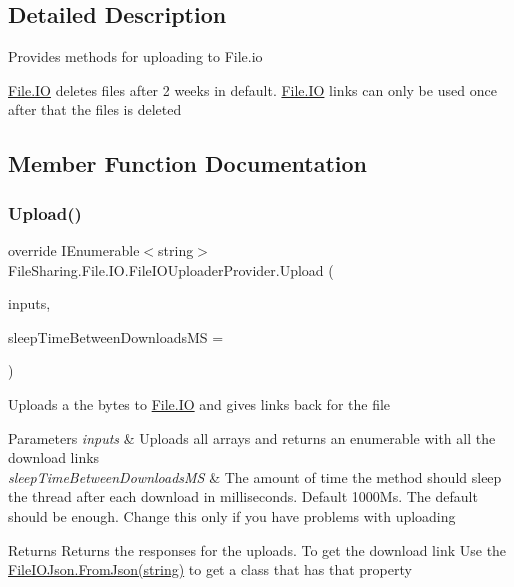 \subsection{Detailed Description}
Provides methods for uploading to File.\+io 

\hyperlink{namespace_file_sharing_1_1_file_1_1_i_o}{File.\+IO} deletes files after 2 weeks in default. \hyperlink{namespace_file_sharing_1_1_file_1_1_i_o}{File.\+IO} links can only be used once after that the files is deleted 

\subsection{Member Function Documentation}
\mbox{\label{class_file_sharing_1_1_file_1_1_i_o_1_1_file_i_o_uploader_provider_a991a7eebd1a55bc38e0b760a0f824928}} 
\subsubsection{\texorpdfstring{Upload()}{Upload()}}
{\footnotesize\ttfamily override I\+Enumerable$<$string$>$ File\+Sharing.\+File.\+I\+O.\+File\+I\+O\+Uploader\+Provider.\+Upload (\begin{DoxyParamCaption}\item[{I\+Enumerable$<$ byte\mbox{[}$\,$\mbox{]}$>$}]{inputs,  }\item[{int}]{sleep\+Time\+Between\+Downloads\+MS = {} }\end{DoxyParamCaption})\hspace{0.3cm}{\ttfamily [virtual]}}



Uploads a the bytes to \hyperlink{namespace_file_sharing_1_1_file_1_1_i_o}{File.\+IO} and gives links back for the file 


\begin{DoxyParams}{Parameters}
{\em inputs} & Uploads all arrays and returns an enumerable with all the download links\\
\hline
{\em sleep\+Time\+Between\+Downloads\+MS} & The amount of time the method should sleep the thread after each download in milliseconds. Default 1000\+Ms. The default should be enough. Change this only if you have problems with uploading \\
\hline
\end{DoxyParams}
\begin{DoxyReturn}{Returns}
Returns the responses for the uploads. To get the download link Use the \hyperlink{class_file_sharing_1_1_file_1_1_i_o_1_1_file_i_o_json_ad5388e800494f0bad65d91858bd8b246}{File\+I\+O\+Json.\+From\+Json(string)} to get a class that has that property
\end{DoxyReturn}


